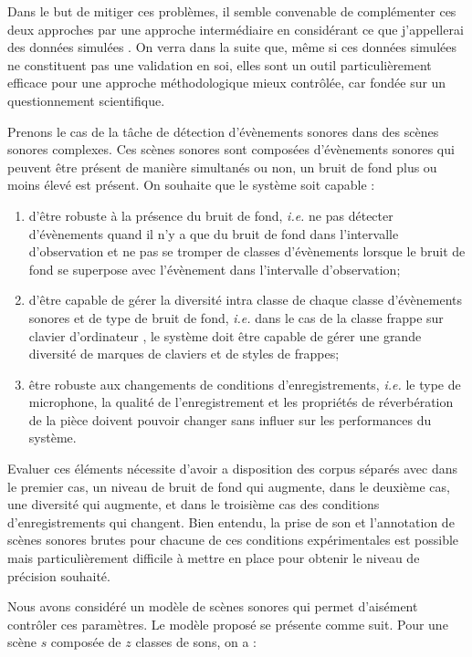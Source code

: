   Dans le but de mitiger ces problèmes, il semble convenable de complémenter ces deux approches par une approche intermédiaire en considérant ce que j'appellerai des données \og simulées \fg. On verra dans la suite que, même si ces données simulées ne constituent pas une validation en soi, elles sont un outil particulièrement efficace pour une approche méthodologique mieux contrôlée, car fondée sur un questionnement scientifique.

  Prenons le cas de la tâche de détection d'évènements sonores dans des scènes sonores complexes. Ces scènes sonores sont composées d'évènements sonores qui peuvent être présent de manière simultanés ou non, un bruit de fond plus ou moins élevé est présent. On souhaite que le système soit capable :
  \begin{enumerate}
    \item d'être robuste à la présence du bruit de fond, \textit{i.e.} ne pas détecter d'évènements quand il n'y a que du bruit de fond dans l'intervalle d'observation et ne pas se tromper de classes d'évènements lorsque le bruit de fond se superpose avec l'évènement  dans l'intervalle d'observation;
    \item d'être capable de gérer la diversité intra classe de chaque classe d'évènements sonores et de type de bruit de fond,  \textit{i.e.} dans le cas de la classe \og frappe sur clavier d'ordinateur \fg, le système doit être capable de gérer une grande diversité de marques de claviers et de styles de frappes;
    \item être robuste aux changements de conditions d'enregistrements,  \textit{i.e.} le type de microphone, la qualité de l'enregistrement et les propriétés de réverbération de la pièce doivent pouvoir changer sans influer sur les performances du système.
  \end{enumerate}

  Evaluer ces éléments nécessite d'avoir a disposition des corpus séparés avec dans le premier cas, un niveau de bruit de fond qui augmente, dans le deuxième cas, une diversité qui augmente, et dans le troisième cas des conditions d'enregistrements qui changent. Bien entendu, la prise de son et l'annotation de scènes sonores brutes pour chacune de ces conditions expérimentales est possible mais particulièrement difficile à mettre en place pour obtenir le niveau de précision souhaité.

  Nous avons considéré un modèle de scènes sonores qui permet d'aisément contrôler ces paramètres. Le modèle proposé se présente comme suit. Pour une scène $s$ composée de $z$ classes de sons, on a :

